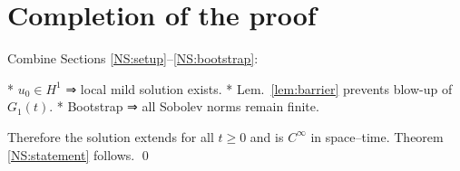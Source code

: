 \section{Completion of the proof}\label{NS:global}

Combine Sections \ref{NS:setup}–\ref{NS:bootstrap}:

* \(u_{0}\in H^{1}\) ⇒ local mild solution exists.
* Lem.~\ref{lem:barrier} prevents blow-up of $G_{1}(t)$.
* Bootstrap ⇒ all Sobolev norms remain finite.

Therefore the solution extends for all $t\ge0$ and is
$C^{\infty}$ in space–time.  Theorem \ref{NS:statement} follows. \qed 